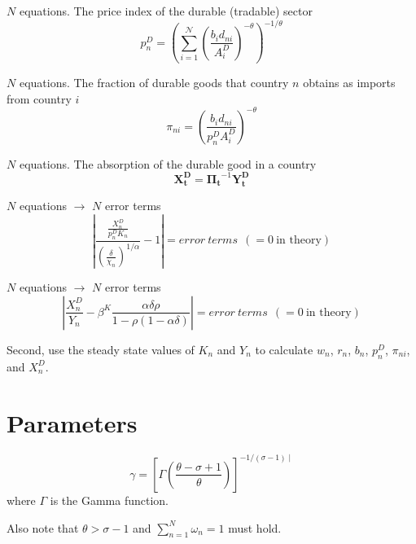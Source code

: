 \documentclass[11pt]{article}
\begin{document}
\noindent $N$ equations. The price index of the durable (tradable) sector
\begin{equation}
p_{n}^{D}=\left(\sum_{i=1}^{\mathcal{N}}\left(\frac{b_{i} d_{n i}}{A_{i}^{D}}\right)^{-\theta}\right)^{-1 / \theta}
\end{equation}

\noindent $N$ equations. The fraction of durable goods that country $n$ obtains as imports from country $i$
\begin{equation}
\pi_{n i}=\left(\frac{b_{i} d_{n i}}{p_{n}^{D} A_{i}^{D}}\right)^{-\theta}
\end{equation}

\noindent $N$ equations. The absorption of the durable good in a country 
\begin{equation}
\mathbf{X^D_t} = \mathbf{\Pi_t}^{-1} \mathbf{Y^D_t}
\end{equation}

\noindent $N$ equations $\rightarrow$ $N$ error terms
\begin{equation}
\left| \frac{\frac{X_{n}^{D}}{p_{n}^{D} K_{n}}}{\left(\frac{\delta}{\chi_{n}}\right)^{1 / \alpha}} - 1 \right| = error \ terms \ \ (= 0 \ \text{in theory})
\end{equation}

\noindent $N$ equations $\rightarrow$ $N$ error terms
\begin{equation}
\left| \frac{X_{n}^{D}}{Y_{n}} - \beta^{K} \frac{\alpha \delta \rho}{1-\rho(1-\alpha \delta)} \right| = error \ terms \ \ (= 0 \ \text{in theory})
\end{equation}

\noindent Second, use the steady state values of $K_n$ and $Y_n$ to calculate $w_n$, $r_n$, $b_n$, $p^D_n$, $\pi_{ni}$, and $X^D_n$.

\section{Parameters}
\begin{equation*}
	\gamma=\left[\Gamma\left(\frac{\theta-\sigma+1}{\theta}\right)\right]^{-1 /(\sigma-1) \mid}
\end{equation*}
where $\Gamma$ is the Gamma function.

\noindent Also note that $\theta > \sigma - 1$ and $\sum^N_{n=1} \omega_n = 1$ must hold.
\end{document}
